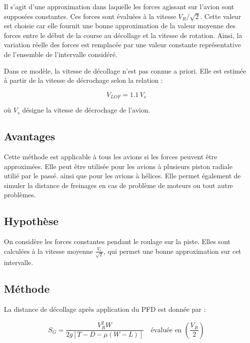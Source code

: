 		Il s'agit d'une approximation dans laquelle les forces agissant sur l'avion sont supposées constantes. Ces forces sont évaluées à la vitesse $V_R/\sqrt{2}$. Cette valeur est choisie car elle fournit une bonne approximation de la valeur moyenne des forces entre le début de la course au décollage et la vitesse de rotation. Ainsi, la variation réelle des forces est remplacée par une valeur constante représentative de l'ensemble de l'intervalle considéré.

		Dans ce modèle, la vitesse de décollage n'est pas connue a priori. Elle est estimée à partir de la vitesse de décrochage selon la relation :
		
		\[		V_{LOF} = 1.1 \, V_s		\]
		
		où $V_s$ désigne la vitesse de décrochage de l'avion.
		
			\subsection{Avantages}
			
				Cette méthode est applicable à tous les avions si les forces peuvent être approximées. Elle peut être utilisée pour les avions à plusieurs piston radiale utilié par le passé. ainsi que pour les avions à hélices. Elle permet également de simuler la distance de freinages en cas de problème de moteurs ou tout autre problèmes.
			
			\vspace{0.3cm}
			
			\subsection{Hypothèse}
			
				On considère les forces constantes pendant le roulage sur la piste. Elles sont calculées à la vitesse moyenne $\frac{V_r}{\sqrt{2}}$, qui permet une bonne approximation sur cet intervalle.
				
				\vspace{0.3cm}
				
			\subsection{Méthode}
				
				La distance de décollage après application du PFD est donnée par :
				
				\begin{equation*}
					S_G= \frac{ V_R^2 W	}{ 2g[T-D-\mu(W-L)]	}
					\quad
					\text{évaluée en }
					\left(\frac{V_R}{2}\right)
				\end{equation*}
				
